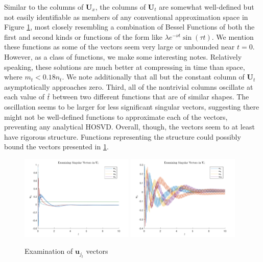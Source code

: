 \documentclass[12pt]{article}
\begin{document}
    Similar to the columns of $\mathbf{U}_x$, the columns of $\mathbf{U}_t$ are somewhat well-defined but not easily identifiable as members of any conventional approximation space in Figure \ref{fig:burgers_ut}, most closely resembling a combination of Bessel Functions of both the first and second kinds or functions of the form like $\lambda e^{-\nu t}\sin(\tau t)$. We mention these functions as some of the vectors seem very large or unbounded near $t=0$. However, as a class of functions, we make some interesting notes. Relatively speaking, these solutions are much better at compressing in time than space, where $m_t<0.18 n_t$. We note additionally that all but the constant column of $\mathbf{U}_t$ asymptotically approaches zero. Third, all of the nontrivial columns oscillate at each value of $\Hat{t}$ between two different functions that are of similar shapes. The oscillation seems to be larger for less significant singular vectors, suggesting there might not be well-defined functions to approximate each of the vectors, preventing any analytical HOSVD. Overall, though, the vectors seem to at least have rigorous structure. Functions representing the structure could possibly bound the vectors presented in \ref{fig:burgers_ut}.
    \begin{figure}[t]
        \centering
        \includegraphics[width=0.48\textwidth]{figures/burgers_ut_1_4.pdf}
        \includegraphics[width=0.48\textwidth]{figures/burgers_ut_7_10.pdf}
        \caption{Examination of $\mathbf{u}_{j_t}$ vectors}
        \label{fig:burgers_ut}
    \end{figure}
\end{document}
